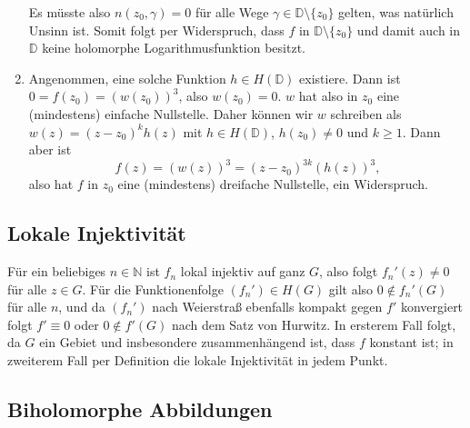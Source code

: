 \documentclass[a4paper]{article}
\begin{document}
\begin{enumerate}
\begin{equation*}
    \end{equation*}
    Es müsste also $n(z_0, \gamma) = 0$ für alle Wege $\gamma \in \mathds{D} \setminus \{z_0\}$ gelten, was natürlich Unsinn ist.
    Somit folgt per Widerspruch, dass $f$ in $\mathds{D} \setminus \{z_0\}$ und damit auch in $\mathds{D}$ keine holomorphe Logarithmusfunktion besitzt.
    \item Angenommen, eine solche Funktion $h \in H(\mathds{D})$ existiere.
    Dann ist $0 = f(z_0) = (w(z_0))^3$, also $w(z_0) = 0$.
    $w$ hat also in $z_0$ eine (mindestens) einfache Nullstelle.
    Daher können wir $w$ schreiben als $w(z) = (z-z_0)^k h(z)$ mit $h \in H(\mathds{D})$, $h(z_0) \neq 0$ und $k \geq 1$.
    Dann aber ist 
    \begin{equation*}
        f(z) = (w(z))^3 = (z-z_0)^{3k} (h(z))^3\text{,}
    \end{equation*}
    also hat $f$ in $z_0$ eine (mindestens) dreifache Nullstelle, ein Widerspruch.
\end{enumerate}


\subsection{Lokale Injektivität}

Für ein beliebiges $n \in \mathds{N}$ ist $f_n$ lokal injektiv auf ganz $G$, also folgt $f_n'(z) \neq 0$ für alle $z \in G$.
Für die Funktionenfolge $(f_n') \in H(G)$ gilt also $0 \notin f_n'(G)$ für alle $n$, und da $(f_n')$ nach Weierstraß ebenfalls kompakt gegen $f'$ konvergiert folgt $f' \equiv 0$ oder $0 \notin f'(G)$ nach dem Satz von Hurwitz.
In ersterem Fall folgt, da $G$ ein Gebiet und insbesondere zusammenhängend ist, dass $f$ konstant ist; in zweiterem Fall per Definition die lokale Injektivität in jedem Punkt.

\subsection{Biholomorphe Abbildungen}
\end{document}
